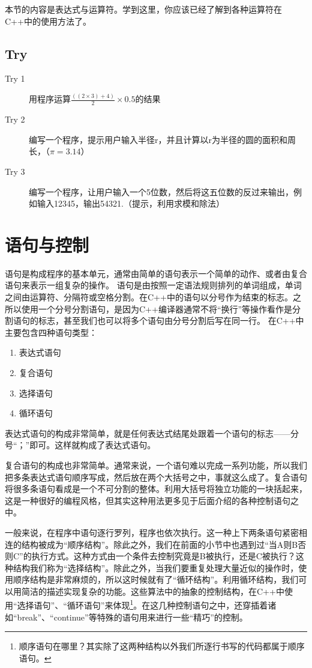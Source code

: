 本节的内容是表达式与运算符。学到这里，你应该已经了解到各种运算符在C++中的使用方法了。

\subsection{Try}
\begin{description}
	\item[Try 1]用程序运算$\frac{((2\times3)+4)}{2}\times0.5$的结果
	\item[Try 2]编写一个程序，提示用户输入半径r，并且计算以r为半径的圆的面积和周长，（$\pi=3.14$）
	\item[Try 3]编写一个程序，让用户输入一个5位数，然后将这五位数的反过来输出，例如输入12345，输出54321.（提示，利用求模和除法）
\end{description}

\section{语句与控制}
语句是构成程序的基本单元，通常由简单的语句表示一个简单的动作、或者由复合语句来表示一组复杂的操作。
语句是由按照一定语法规则排列的单词组成，单词之间由运算符、分隔符或空格分割。在C++中的语句以分号作为结束的标志。之所以使用一个分号分割语句，是因为C++编译器通常不将“换行”等操作看作是分割语句的标志，甚至我们也可以将多个语句由分号分割后写在同一行。
在C++中主要包含四种语句类型：

\begin{enumerate}
	\item{表达式语句}
	\item{复合语句}
	\item{选择语句}
	\item{循环语句}
\end{enumerate}

表达式语句的构成非常简单，就是任何表达式结尾处跟着一个语句的标志——分号“；”即可。这样就构成了表达式语句。

复合语句的构成也非常简单。通常来说，一个语句难以完成一系列功能，所以我们把多条表达式语句顺序写成，然后放在两个大括号之中，事就这么成了。复合语句将很多条语句看成是一个不可分割的整体。利用大括号将独立功能的一块括起来，这是一种很好的编程风格，但其实这种用法更多见于后面介绍的各种控制语句之中。

一般来说，在程序中语句逐行罗列，程序也依次执行。这一种上下两条语句紧密相连的结构被成为“顺序结构”。除此之外，我们在前面的小节中也遇到过“当A则B否则C”的执行方式。这种方式由一个条件去控制究竟是B被执行，还是C被执行？这种结构我们称为“选择结构”。除此之外，当我们要重复处理大量近似的操作时，使用顺序结构是非常麻烦的，所以这时候就有了“循环结构”。利用循环结构，我们可以用简洁的描述实现复杂的功能。这些算法中的抽象的控制结构，在C++中使用“选择语句”、“循环语句”来体现\footnote{顺序语句在哪里？其实除了这两种结构以外我们所逐行书写的代码都属于顺序语句。}。在这几种控制语句之中，还穿插着诸如“break”、“continue”等特殊的语句用来进行一些“精巧”的控制。

